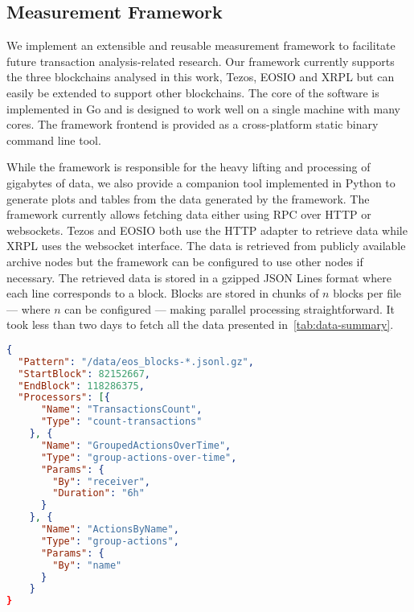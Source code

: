 \subsection{Measurement Framework}
We implement an extensible and reusable measurement framework to facilitate future transaction analysis-related research.
Our framework currently supports the three blockchains analysed in this work, Tezos, EOSIO and XRPL but can easily be extended to support other blockchains.
The core of the software is implemented in Go and is designed to work well on a single machine with many cores.
The framework frontend is provided as a cross-platform static binary command line tool.

While the framework is responsible for the heavy lifting and processing of gigabytes of data, we also provide a companion tool implemented in Python to generate plots and tables from the data generated by the framework.
The framework currently allows fetching data either using RPC over HTTP or websockets.
Tezos and EOSIO both use the HTTP adapter to retrieve data while XRPL uses the websocket interface.
The data is retrieved from publicly available archive nodes but the framework can be configured to use other nodes if necessary.
The retrieved data is stored in a gzipped JSON Lines format where each line corresponds to a block. Blocks are stored in chunks of $n$ blocks per file --- where $n$ can be configured --- making parallel processing straightforward. It took less than two days to fetch all the data presented in~\autoref{tab:data-summary}.

\begin{lstlisting}[language=json,caption=Configuration file for our measurement framework,label=lis:framework-config]
{
  "Pattern": "/data/eos_blocks-*.jsonl.gz",
  "StartBlock": 82152667,
  "EndBlock": 118286375,
  "Processors": [{
      "Name": "TransactionsCount",
      "Type": "count-transactions"
    }, {
      "Name": "GroupedActionsOverTime",
      "Type": "group-actions-over-time",
      "Params": {
        "By": "receiver",
        "Duration": "6h"
      }
    }, {
      "Name": "ActionsByName",
      "Type": "group-actions",
      "Params": {
        "By": "name"
      }
    }
}
\end{lstlisting}

